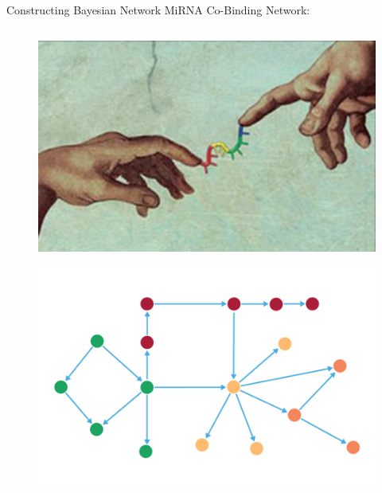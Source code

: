 \documentclass{beamer}
\begin{document}
\begin{frame}{Constructing Bayesian Network}
  MiRNA Co-Binding Network:
	\begin{columns}
		\begin{column}[t]{.48\textwidth}
			\begin{figure}[ht]
				\centering
				\includegraphics[width=1\textwidth,height=0.3\textheight]{figures/mirna-cobinding.jpg}
				\caption*{\label{fig:mirna-cobinding}}
			\end{figure}
			\vspace{-1.5cm}
			\begin{figure}[ht]
				\centering
				\includegraphics[width=1\textwidth]{figures/directed.png}
				\caption*{\label{fig:directed}}
			\end{figure}
		\end{column}


\end{columns}
\end{frame}
\end{document}
